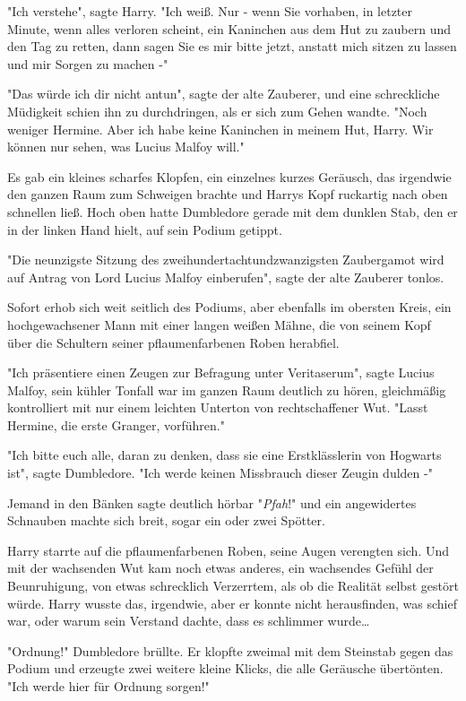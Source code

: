 {"Ich verstehe", sagte Harry. "Ich weiß. Nur - wenn Sie vorhaben, in letzter Minute, wenn alles verloren scheint, ein Kaninchen aus dem Hut zu zaubern und den Tag zu retten, dann sagen Sie es mir bitte jetzt, anstatt mich sitzen zu lassen und mir Sorgen zu machen -"

"Das würde ich dir nicht antun", sagte der alte Zauberer, und eine schreckliche Müdigkeit schien ihn zu durchdringen, als er sich zum Gehen wandte. "Noch weniger Hermine. Aber ich habe keine Kaninchen in meinem Hut, Harry. Wir können nur sehen, was Lucius Malfoy will."

Es gab ein kleines scharfes Klopfen, ein einzelnes kurzes Geräusch, das irgendwie den ganzen Raum zum Schweigen brachte und Harrys Kopf ruckartig nach oben schnellen ließ. Hoch oben hatte Dumbledore gerade mit dem dunklen Stab, den er in der linken Hand hielt, auf sein Podium getippt.

"Die neunzigste Sitzung des zweihundertachtundzwanzigsten Zaubergamot wird auf Antrag von Lord Lucius Malfoy einberufen", sagte der alte Zauberer tonlos.

Sofort erhob sich weit seitlich des Podiums, aber ebenfalls im obersten Kreis, ein hochgewachsener Mann mit einer langen weißen Mähne, die von seinem Kopf über die Schultern seiner pflaumenfarbenen Roben herabfiel.

"Ich präsentiere einen Zeugen zur Befragung unter Veritaserum", sagte Lucius Malfoy, sein kühler Tonfall war im ganzen Raum deutlich zu hören, gleichmäßig kontrolliert mit nur einem leichten Unterton von rechtschaffener Wut. "Lasst Hermine, die erste Granger, vorführen."

"Ich bitte euch alle, daran zu denken, dass sie eine Erstklässlerin von Hogwarts ist", sagte Dumbledore. "Ich werde keinen Missbrauch dieser Zeugin dulden -"

Jemand in den Bänken sagte deutlich hörbar "\emph{Pfah}!" und ein angewidertes Schnauben machte sich breit, sogar ein oder zwei Spötter.

Harry starrte auf die pflaumenfarbenen Roben, seine Augen verengten sich. Und mit der wachsenden Wut kam noch etwas anderes, ein wachsendes Gefühl der Beunruhigung, von etwas schrecklich Verzerrtem, als ob die Realität selbst gestört würde. Harry wusste das, irgendwie, aber er konnte nicht herausfinden, was schief war, oder warum sein Verstand dachte, dass es schlimmer wurde…

"Ordnung!" Dumbledore brüllte. Er klopfte zweimal mit dem Steinstab gegen das Podium und erzeugte zwei weitere kleine Klicks, die alle Geräusche übertönten. "Ich werde hier für Ordnung sorgen!"

}
